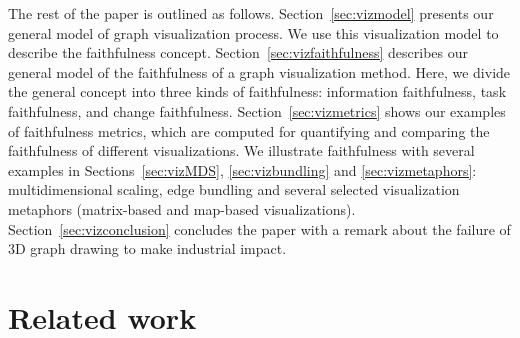 \documentclass[10pt,journal,cspaper,compsoc]{IEEEtran}
\begin{document}
The rest of the paper is outlined as follows.
Section~\ref{sec:vizmodel} presents our general model of graph visualization process. We use this visualization model to describe the faithfulness concept.
Section~\ref{sec:vizfaithfulness} describes our general model of the faithfulness of a graph visualization method. Here, we divide the general concept into three kinds of faithfulness: information faithfulness, task faithfulness, and change faithfulness.
Section~\ref{sec:vizmetrics} shows our examples of faithfulness metrics, which are computed for quantifying and comparing the faithfulness of different visualizations.
We illustrate faithfulness with several examples in Sections~\ref{sec:vizMDS}, \ref{sec:vizbundling} and \ref{sec:vizmetaphors}: multidimensional scaling, edge bundling and several selected visualization metaphors (matrix-based and
map-based visualizations).
Section~\ref{sec:vizconclusion} concludes the paper with a remark about the failure of 3D graph drawing to make industrial impact.

\section{Related work}


\end{document}
